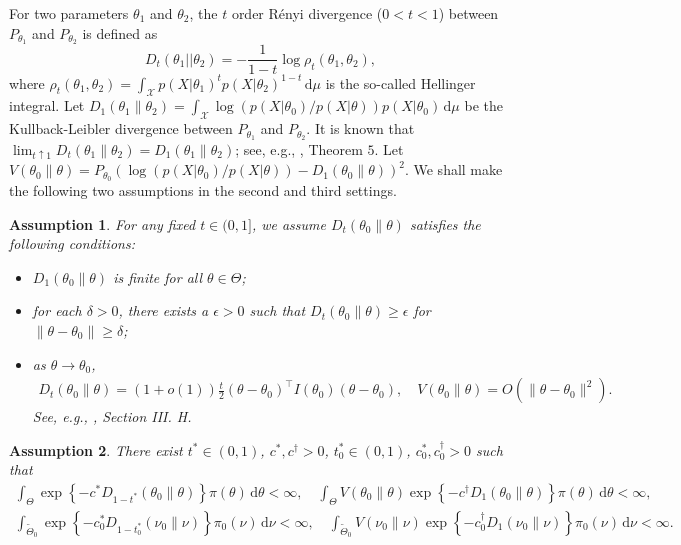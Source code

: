 \documentclass[11pt]{article}
\theoremstyle{plain}
\newtheorem{assumption}{\quad\quad Assumption}
\theoremstyle{definition}
\theoremstyle{remark}
\begin{document}
 For two parameters $\theta_1$ and $\theta_2$, the $t$ order R\'{e}nyi divergence ($0<t <1$) between $P_{\theta_1}$ and $P_{\theta_2}$ is defined as
$$
D_{t}(\theta_1||\theta_2)=-\frac{1}{1-t}\log \rho_{t}(\theta_1,\theta_2),
$$
where
$
\rho_{t}(\theta_1,\theta_2)=\int_{\mathcal{X}} p(X|\theta_1)^{t} p(X|\theta_2)^{1-t} \, \mathrm d \mu
$ is the so-called Hellinger integral.
Let $D_1(\theta_1 \| \theta_2) = \int_{\mathcal X} \log \left( p(X | \theta_0) / p( X | \theta) \right) p(X |\theta_0) \, \mathrm d \mu$ be the Kullback-Leibler divergence between $P_{\theta_1}$ and $P_{\theta_2}$.
It is known that $\lim_{t \uparrow 1} D_t(\theta_1 \| \theta_2) = D_1 (\theta_1 \| \theta_2)$; see, e.g., \cite{Erven2014}, Theorem $5$.
Let 
 $V(\theta_0 \| \theta) = P_{\theta_0} \left( \log \left( p(X|\theta_0) / p(X | \theta) \right) - D_1 (\theta_0 \| \theta) \right)^2$.
We shall make the following two assumptions in the second and third settings.
\begin{assumption}
    For any fixed $t \in (0,1]$,
    we assume $D_t\left( \theta_0 \| \theta \right)$ satisfies the following conditions:
    \begin{itemize}
        \item 
    $D_1(\theta_0 \| \theta)$ is finite for all $\theta \in \Theta$;
\item
    for each $\delta >0$,
    there exists a $\epsilon>0$ such that $D_t\left( \theta_0 \| \theta \right)\geq \epsilon$ for $\|\theta-\theta_0\| \geq \delta$;
\item
    as $\theta \to \theta_0$, 
    \begin{align*}
        D_t(\theta_0 \| \theta) = (1+o(1))\frac{t}{2} (\theta -\theta_0)^\top I(\theta_0) (\theta - \theta_0),\quad
        V(\theta_0 \| \theta ) = O\left( \|\theta - \theta_0\|^2 \right)
        .
    \end{align*}
    See, e.g., \cite{Erven2014}, Section III. H.
    \end{itemize}
    \label{assumption2019}
\end{assumption}
\begin{assumption}
    There exist $t^* \in (0,1)$, $c^*, c^\dagger > 0$, $t_0^* \in (0,1)$, $c_0^*, c_0^\dagger > 0$ such that
    \begin{align*}
        \int_{\Theta} \exp\left\{ -c^* D_{1-t^*}(\theta_0 \| \theta) \right\} \pi (\theta) \, \mathrm d \theta < \infty,
        \quad
        \int_{\Theta} V(\theta_0 \|\theta) \exp\left\{ -c^\dagger D_{1}(\theta_0 \| \theta) \right\} \pi (\theta) \, \mathrm d \theta < \infty,
    \end{align*}
    \begin{align*}
        \int_{\tilde{\Theta}_0} \exp\left\{ -c_0^* D_{1-t_0^*}(\nu_0 \| \nu) \right\} \pi_0 (\nu) \, \mathrm d \nu < \infty,
        \quad
        \int_{\tilde \Theta_0} V(\nu_0 \|\nu) \exp\left\{ - c_0^\dagger D_{1}(\nu_0 \| \nu) \right\} \pi_0 (\nu) \, \mathrm d \nu < \infty.
    \end{align*}
    \label{assumption:prior}
\end{assumption}
\end{document}
